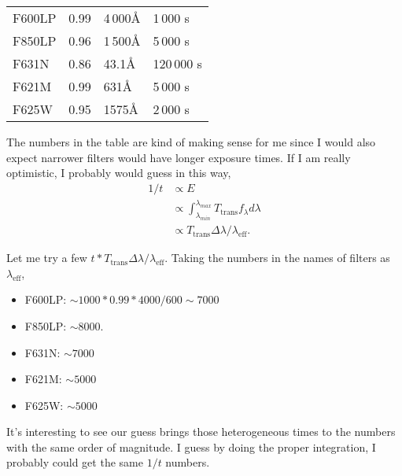 \documentclass[12pt,letterpaper]{article}
\begin{document}
\begin{enumerate}
\begin{tabular}{ |p{3cm} || p{3cm}|p{3cm}|p{3cm}| }
        F600LP& 0.99        & 4\,000\AA& 1\,000   s   \\
        F850LP& 0.96        & 1\,500\AA& 5\,000   s   \\
        F631N & 0.86        &   43.1\AA& 120\,000 s   \\
        F621M & 0.99        &    631\AA& 5\,000   s   \\
        F625W & 0.95        &   1575\AA& 2\,000   s   \\
        \hline
    \end{tabular}

    The numbers in the table are kind of making sense for me 
    since I would also expect narrower filters
    would have longer exposure times.
    If I am really optimistic, I probably would guess in this way, 
    \begin{equation}
        \begin{split}
            1 / t &\propto E\\
              &\propto \int_{\lambda_{min}}^{\lambda_{max}} T_{\mathrm{trans}} f_\lambda d\lambda\\
              &\propto     T_{\mathrm{trans}}  \Delta \lambda / \lambda_{\mathrm{eff}}.
        \end{split}
    \end{equation}

    Let me try a few $t * T_{\mathrm{trans}} \Delta \lambda / \lambda_\mathrm{eff}$. 
    Taking the numbers in the names of filters as $\lambda_\mathrm{eff}$,

    \begin{itemize}
        \item F600LP: $\sim 1000 * 0.99 * 4000 / 600 \sim 7000$
        \item F850LP: $\sim 8000$.
        \item F631N:  $\sim 7000$
        \item F621M:  $\sim 5000$
        \item F625W:  $\sim 5000$
    \end{itemize}
    
    It's interesting to see our guess brings those heterogeneous times
    to the numbers with the same order of magnitude. 
    I guess by doing the proper integration, I probably could get the 
    same $1/t$ numbers.

\end{enumerate}
\end{document}
